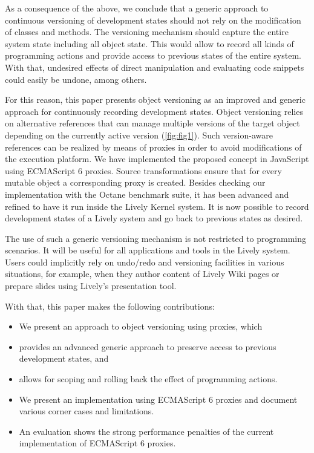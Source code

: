 \documentclass{sigplanconf}
\begin{document}
As a consequence of the above, we conclude that a generic approach to
continuous versioning of development states should not rely on the
modification of classes and methods. The versioning mechanism should
capture the entire system state including all object state. This would
allow to record all kinds of programming actions and provide access to
previous states of the entire system. With that, undesired effects of
direct manipulation and evaluating code snippets could easily be
undone, among others.

For this reason, this paper presents object versioning as an improved
and generic approach for continuously recording development states. Object
versioning relies on alternative references that can manage multiple
versions of the target object depending on the currently active
version (\autoref{fig:fig1}). Such version-aware references can be
realized by means of proxies in order to avoid modifications of the
execution platform. We have implemented the proposed concept in
JavaScript using ECMAScript 6 proxies. Source transformations ensure
that for every mutable object a corresponding proxy is created. Besides
checking our implementation with the Octane benchmark suite, it has been
advanced and refined to have it run inside the Lively Kernel system. It is
now possible to record development states of a Lively system and go back to
previous states as desired.

The use of such a generic versioning mechanism is not restricted to
programming scenarios. It will be useful for all applications and
tools in the Lively system. Users could implicitly rely on undo/redo
and versioning facilities in various situations, for example, when they
author content of Lively Wiki pages or prepare slides using Lively's
presentation tool.

With that, this paper makes the following contributions:
\begin{itemize}
\item We present an approach to object versioning using proxies, which
\item provides an advanced generic approach to preserve access to
  previous development states, and
\item allows for scoping and rolling back the effect of programming
  actions.
\item We present an implementation using ECMAScript 6 proxies and
  document various corner cases and limitations.
\item An evaluation shows the strong performance penalties of the
  current implementation of ECMAScript 6 proxies. 
\end{itemize}
\end{document}
